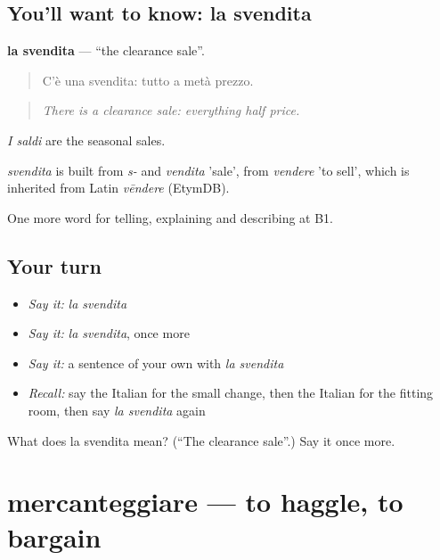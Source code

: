 \subsection*{You'll want to know: la svendita}
\textbf{la svendita} — \textquotedblleft{}the clearance sale\textquotedblright{}.

\begin{quote}
C'è una svendita: tutto a metà prezzo.
\end{quote}

\begin{quote}
\emph{There is a clearance sale: everything half price.}
\end{quote}

\emph{I saldi} are the seasonal sales.

\begin{cousinweb}
\emph{svendita} is built from \emph{s-} and \emph{vendita} 'sale', from \emph{vendere} 'to sell', which is inherited from Latin \emph{vēndere} (EtymDB).
\end{cousinweb}

\begin{grammarlens}[title={What you've built}]
One more word for telling, explaining and describing at B1.
\end{grammarlens}

\subsection*{Your turn}
\begin{itemize}
\raggedright
  \item \emph{Say it:} \emph{la svendita}
  \item \emph{Say it:} \emph{la svendita}, once more
  \item \emph{Say it:} a sentence of your own with \emph{la svendita}
  \item \emph{Recall:} say the Italian for the small change, then the Italian for the fitting room, then say \emph{la svendita} again
\end{itemize}

\begin{tcolorbox}[breakable,colback=teal!4,colframe=teal!35!black,title={Before you move on}]
What does la svendita mean? (\textquotedblleft{}The clearance sale\textquotedblright{}.) Say it once more.
\end{tcolorbox}
\section[mercanteggiare]{mercanteggiare — to haggle, to bargain}

